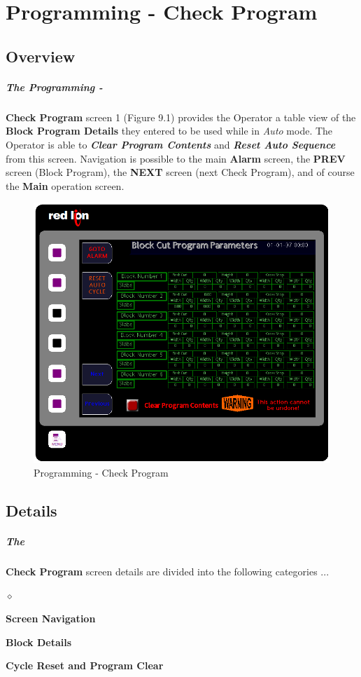 \chapter{Programming - Check Program}
\section{Overview}\paragraph*{The Programming -}\textbf{ Check Program} screen 1 (Figure 9.1) provides the Operator a table view of the \textbf{Block Program Details} they entered to be used while in \textit{Auto} mode. The Operator is able to \textbf{\textit{Clear Program Contents}} and \textbf{\textit{Reset Auto Sequence}} from this screen. Navigation is possible to the main \textbf{Alarm} screen, the \textbf{PREV} screen (Block Program), the \textbf{NEXT} screen (next Check Program), and of course the \textbf{Main} operation screen.
\begin{figure}
	\centering
	\includegraphics[width=0.5\linewidth]{screen-captures/program/pgm_review1}
	\caption{Programming - Check Program}
	\label{fig:prg-chk-prg}
\end{figure}
\section{Details}\paragraph*{The}\textbf{Check Program} screen details are divided into the following categories ...
\begin{list}{$\diamond$}{}
	\item \textbf{Screen Navigation}
	\item \textbf{Block Details}
	\item \textbf{Cycle Reset and Program Clear}
\end{list}
\pagebreak
